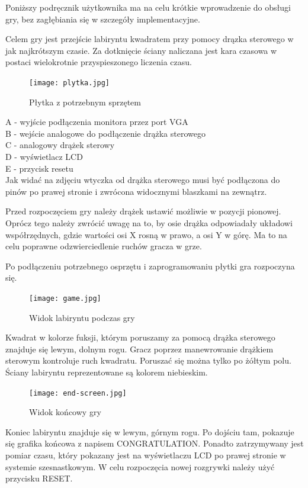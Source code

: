 \documentclass[11pt]{article}
\begin{document}
Poniższy podręcznik użytkownika ma na celu krótkie wprowadzenie do obsługi gry, bez zagłębiania się w szczegóły implementacyjne.

Celem gry jest przejście labiryntu kwadratem przy pomocy drązka sterowego w jak najkrótszym czasie. Za dotknięcie ściany naliczana jest kara czasowa w postaci wielokrotnie przyspieszonego liczenia czasu.

\begin{figure}[H]
\centering
\texttt{[image: plytka.jpg]}
\caption{Płytka z potrzebnym sprzętem}
\end{figure}

\noindent
A - wyjście podłączenia monitora przez port VGA \\
B - wejście analogowe do podłączenie drążka sterowego \\
C - analogowy drążek sterowy \\
D - wyświetlacz LCD \\
E - przycisk resetu \\

Jak widać na zdjęciu wtyczka od drążka sterowego musi być podłączona do pinów po prawej stronie i zwrócona widocznymi blaszkami na zewnątrz.

Przed rozpoczęciem gry należy drążek ustawić możliwie w pozycji pionowej.
Oprócz tego należy zwrócić uwagę na to, by osie drążka odpowiadały układowi współrzędnych, gdzie wartości osi X rosną w prawo, a osi Y w górę.
Ma to na celu poprawne odzwierciedlenie ruchów gracza w grze.

Po podłączeniu potrzebnego osprzętu i zaprogramowaniu płytki gra rozpoczyna się. 
\begin{figure}[H]
\centering
\texttt{[image: game.jpg]}
\caption{Widok labiryntu podczas gry}
\end{figure}

Kwadrat w kolorze fuksji, którym poruszamy za pomocą drążka sterowego znajduje się lewym, dolnym rogu.
Gracz poprzez manewrowanie drążkiem sterowym kontroluje ruch kwadratu.
Poruszać się można tylko po żółtym polu. Ściany labiryntu reprezentowane są kolorem niebieskim.

\begin{figure}[H]
\centering
\texttt{[image: end-screen.jpg]}
\caption{Widok końcowy gry}
\end{figure}

Koniec labiryntu znajduje się w lewym, górnym rogu.
Po dojściu tam, pokazuje się grafika końcowa z napisem CONGRATULATION. %
Ponadto zatrzymywany jest pomiar czasu, który pokazany jest na wyświetlaczu LCD po prawej stronie w systemie szesnastkowym.
W celu rozpoczęcia nowej rozgrywki należy użyć przycisku RESET.
\end{document}
